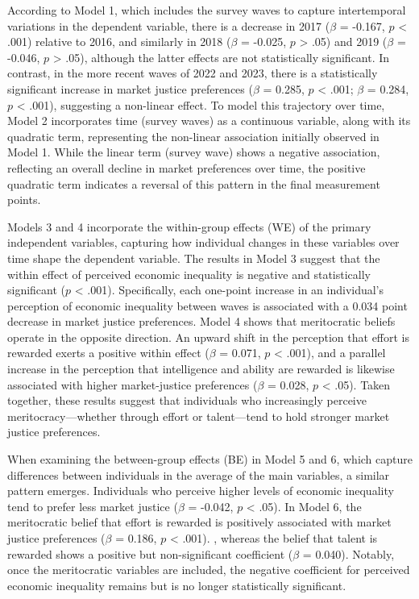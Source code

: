 \documentclass[
  12pt,
]{article}
\begin{document}
According to Model 1, which includes the survey waves to capture
intertemporal variations in the dependent variable, there is a decrease
in 2017 (\(\beta\) = -0.167, \(p\) \textless{} .001) relative to 2016,
and similarly in 2018 (\(\beta\) = -0.025, \(p\) \textgreater{} .05) and
2019 (\(\beta\) = -0.046, \(p\) \textgreater{} .05), although the latter
effects are not statistically significant. In contrast, in the more
recent waves of 2022 and 2023, there is a statistically significant
increase in market justice preferences (\(\beta\) = 0.285, \(p\)
\textless{} .001; \(\beta\) = 0.284, \(p\) \textless{} .001), suggesting
a non-linear effect. To model this trajectory over time, Model 2
incorporates time (survey waves) as a continuous variable, along with
its quadratic term, representing the non-linear association initially
observed in Model 1. While the linear term (survey wave) shows a
negative association, reflecting an overall decline in market
preferences over time, the positive quadratic term indicates a reversal
of this pattern in the final measurement points.

Models 3 and 4 incorporate the within-group effects (WE) of the primary
independent variables, capturing how individual changes in these
variables over time shape the dependent variable. The results in Model 3
suggest that the within effect of perceived economic inequality is
negative and statistically significant (\(p\) \textless{} .001).
Specifically, each one-point increase in an individual's perception of
economic inequality between waves is associated with a 0.034 point
decrease in market justice preferences. Model 4 shows that meritocratic
beliefs operate in the opposite direction. An upward shift in the
perception that effort is rewarded exerts a positive within effect
(\(\beta\) = 0.071, \(p\) \textless{} .001), and a parallel increase in
the perception that intelligence and ability are rewarded is likewise
associated with higher market-justice preferences (\(\beta\) = 0.028,
\(p\) \textless{} .05). Taken together, these results suggest that
individuals who increasingly perceive meritocracy---whether through
effort or talent---tend to hold stronger market justice preferences.

When examining the between-group effects (BE) in Model 5 and 6, which
capture differences between individuals in the average of the main
variables, a similar pattern emerges. Individuals who perceive higher
levels of economic inequality tend to prefer less market justice
(\(\beta\) = -0.042, \(p\) \textless{} .05). In Model 6, the
meritocratic belief that effort is rewarded is positively associated
with market justice preferences (\(\beta\) = 0.186, \(p\) \textless{}
.001). , whereas the belief that talent is rewarded shows a positive but
non-significant coefficient (\(\beta\) = 0.040). Notably, once the
meritocratic variables are included, the negative coefficient for
perceived economic inequality remains but is no longer statistically
significant.
\end{document}
